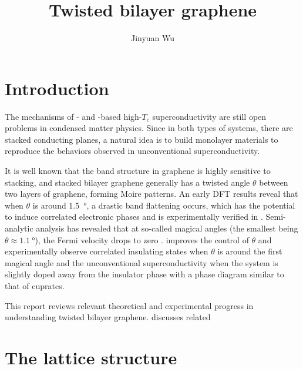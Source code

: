 \documentclass[hyperref, a4paper]{article}
\title{Twisted bilayer graphene}
\author{Jinyuan Wu}
\begin{document}
    
\maketitle

\section{Introduction}

The mechanisms of - and -based high-$T_{\text{c}}$ superconductivity 
are still open problems in condensed matter physics.
Since in both types of systems, 
there are stacked conducting planes, 
a natural idea is to build monolayer materials to reproduce the behaviors observed in 
unconventional superconductivity.

It is well known that the band structure in graphene 
is highly sensitive to stacking,
and stacked bilayer graphene generally has 
a twisted angle $\theta$ between two layers of graphene,
forming Moire patterns.
An early DFT results reveal that when 
$\theta$ is around \SI{1.5}{\degree},
a drastic band flattening occurs,
which has the potential to induce correlated electronic phases 
and is experimentally verified in \cite{li_observation_2010}.
Semi-analytic analysis has revealed that 
at so-called magical angles (the smallest being $\theta \approx \SI{1.1}{\degree}$), 
the Fermi velocity drops to zero
\cite{bistritzer_moire_2011}.
\cite{cao_correlated_2018,cao_unconventional_2018} 
improves the control of $\theta$ and 
experimentally observe correlated insulating states when $\theta$ is around the first magical angle 
and the unconventional superconductivity when the system is slightly doped away from the insulator phase
with a phase diagram similar to that of cuprates.

This report reviews relevant theoretical and experimental progress 
in understanding twisted bilayer graphene.
 discusses related

\section{The lattice structure}\label{sec:lattice}
\end{document}
